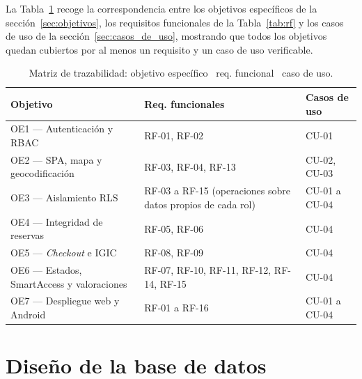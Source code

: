 La Tabla~\ref{tab:trazabilidad} recoge la correspondencia entre los objetivos específicos de la sección~\ref{sec:objetivos}, los requisitos funcionales de la Tabla~\ref{tab:rf} y los casos de uso de la sección~\ref{sec:casos_de_uso}, mostrando que todos los objetivos quedan cubiertos por al menos un requisito y un caso de uso verificable.

\begin{table}[htbp]
  \centering
  \caption{Matriz de trazabilidad: objetivo específico \textrightarrow\ req. funcional \textrightarrow\ caso de uso.}
  \label{tab:trazabilidad}
  \begin{tabularx}{\textwidth}{lXX}
    \toprule
    \textbf{Objetivo}                         & \textbf{Req. funcionales}                                   & \textbf{Casos de uso} \\
    \midrule
    \rowcolor{gray!5}
    OE1 — Autenticación y RBAC                & RF-01, RF-02                                                & CU-01                 \\
    OE2 — SPA, mapa y geocodificación         & RF-03, RF-04, RF-13                                         & CU-02, CU-03          \\
    \rowcolor{gray!5}
    OE3 — Aislamiento RLS                     & RF-03 a RF-15 (operaciones sobre datos propios de cada rol) & CU-01 a CU-04         \\
    OE4 — Integridad de reservas              & RF-05, RF-06                                                & CU-04                 \\
    \rowcolor{gray!5}
    OE5 — \textit{Checkout} e IGIC            & RF-08, RF-09                                                & CU-04                 \\
    OE6 — Estados, SmartAccess y valoraciones & RF-07, RF-10, RF-11, RF-12, RF-14, RF-15                    & CU-04                 \\
    \rowcolor{gray!5}
    OE7 — Despliegue web y Android            & RF-01 a RF-16                                               & CU-01 a CU-04         \\
    \bottomrule
  \end{tabularx}
\end{table}

\section{Diseño de la base de datos}
\label{sec:diseno-bd}

